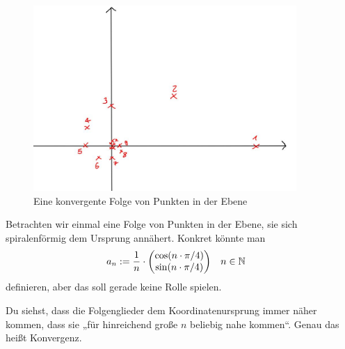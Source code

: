 \begin{bem}[Intuition]
    \begin{figure}[ht]
        \includegraphics[width=10cm]{./_img/Spirale.jpeg}
        \centering \caption{Eine konvergente Folge von Punkten in der Ebene}
    \end{figure}
    Betrachten wir einmal eine Folge von Punkten in der Ebene, sie sich spiralenförmig dem Ursprung annähert. Konkret könnte man
    \begin{align*}
        a_n & := \frac{1}{n}\cdot \begin{pmatrix}
            \cos(n\cdot \pi/4) \\
            \sin(n\cdot \pi/4)
        \end{pmatrix} && n\in \mathbb N
    \end{align*}
    definieren, aber das soll gerade keine Rolle spielen.
    
    Du siehst, dass die Folgenglieder dem Koordinatenursprung immer näher kommen, dass sie „für hinreichend große $n$ beliebig nahe kommen“. Genau das heißt Konvergenz.
\end{bem}


